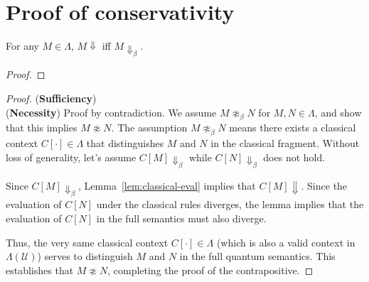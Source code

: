 \section{Proof of conservativity}
\begin{lem} \label{lem:classical-eval}
  For any $M \in \Lambda$, $M \Downarrow$ iff $M \Downarrow_\beta$.
\end{lem}
\begin{proof}
\end{proof}

\ConservTheorem*
\begin{proof}[Proof]
  (\textbf{Sufficiency})
  \\
  (\textbf{Necessity})
  Proof by contradiction.
  We assume $M \not\approx_{\beta} N$ for $M, N \in \Lambda$, and show that this implies $M \not\approx N$.
  The assumption $M \not\approx_{\beta} N$ means there exists a classical context $C[\cdot] \in \Lambda$ that distinguishes $M$ and $N$ in the classical fragment.
  Without loss of generality, let's assume $C[M] \Downarrow_\beta$ while $C[N] \Downarrow_\beta$ does not hold.

  Since $C[M] \Downarrow_\beta$, Lemma~\ref{lem:classical-eval} implies that $C[M] \Downarrow$.
  Since the evaluation of $C[N]$ under the classical rules diverges, the lemma implies that the evaluation of $C[N]$ in the full semantics must also diverge.

  Thus, the very same classical context $C[\cdot] \in \Lambda$ (which is also a valid context in $\Lambda(\mathcal{U})$) serves to distinguish $M$ and $N$ in the full quantum semantics.
  This establishes that $M \not\approx N$, completing the proof of the contrapositive.
\end{proof}